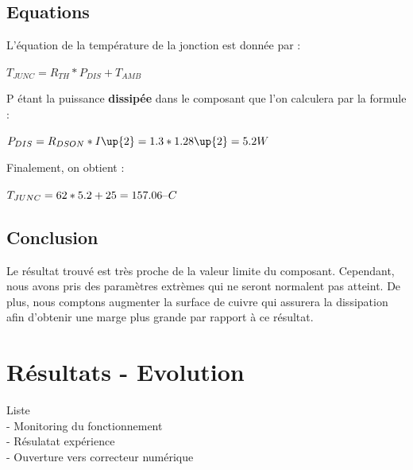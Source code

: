 \documentclass[11pt, french]{article} %
\begin{document}
\subsection{Equations}

\noindent
L'équation de la température de la jonction est donnée par :

\vspace{0.5cm}

\noindent
$
T_{JUNC} = R_{TH} * P_{DIS} + T_{AMB}
$

\vspace{0.5cm}

\noindent
P étant la puissance \textbf{dissipée} dans le composant que l'on calculera par la formule :

\vspace{0.5cm}

\noindent
$
P_{DIS} = R_{DSON} * I\up{2} = 1.3 * 1.28\up{2} = 5.2 W
$

\vspace{0.5cm}

\noindent
Finalement, on obtient :

\vspace{0.5cm}

\noindent
$
T_{JUNC} = 62 * 5.2 + 25 = 157.06 \char123C
$

\subsection{Conclusion}

\noindent
Le résultat trouvé est très proche de la valeur limite du composant. Cependant, nous avons pris des paramètres extrèmes qui ne seront normalent pas atteint. De plus, nous comptons augmenter la surface de cuivre qui assurera la dissipation afin d'obtenir une marge plus grande par rapport à ce résultat.

\section{Résultats - Evolution}
Liste
\\- Monitoring du fonctionnement
\\- Résulatat expérience
\\- Ouverture vers correcteur numérique
\end{document}

